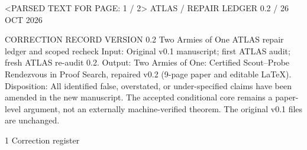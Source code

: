 <PARSED TEXT FOR PAGE: 1 / 2>
ATLAS / REPAIR LEDGER                                                                                         0.2 / 26 OCT 2026



CORRECTION RECORD                                                                                                VERSION 0.2
Two Armies of One
ATLAS repair ledger and scoped recheck
Input: Original v0.1 manuscript; first ATLAS audit; fresh ATLAS re-audit 0.2.
Output: Two Armies of One: Certified Scout–Probe Rendezvous in Proof Search, repaired v0.2 (9-page paper
and editable LaTeX).
Disposition: All identified false, overstated, or under-specified claims have been amended in the new manuscript.
The accepted conditional core remains a paper-level argument, not an externally machine-verified theorem. The
original v0.1 files are unchanged.


1 Correction register

